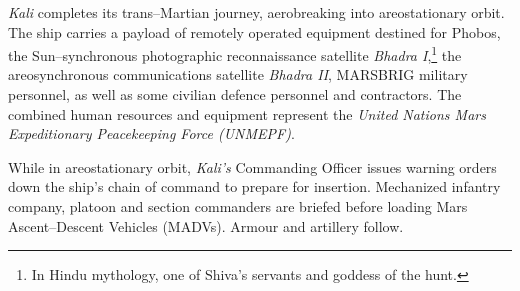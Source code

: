 {\it Kali} completes its trans--Martian journey, aerobreaking into areostationary orbit. The ship carries a payload of remotely operated equipment destined for Phobos, the Sun--synchronous photographic reconnaissance satellite {\it Bhadra I},\footnote{In Hindu mythology, one of Shiva's servants and goddess of the hunt.} the areosynchronous communications satellite {\it Bhadra II}, MARSBRIG military personnel, as well as some civilian defence personnel and contractors. The combined human resources and equipment represent the {\it United Nations Mars Expeditionary Peacekeeping Force (UNMEPF)}.
\StopTimelineDate

While in areostationary orbit, {\it Kali's} Commanding Officer issues warning orders down the ship's chain of command to prepare for insertion. Mechanized infantry company, platoon and section commanders are briefed before loading Mars Ascent--Descent Vehicles (MADVs). Armour and artillery follow.
\StopTimelineDate

